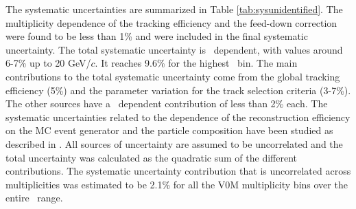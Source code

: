 The systematic uncertainties are summarized in Table \ref{tab:sysunidentified}. The multiplicity dependence of the tracking efficiency and the feed-down correction were found to be less than 1\% and were included in the final systematic uncertainty. The total systematic uncertainty is \pt~dependent, with values around 6-7\% up to 20 GeV/$c$. It reaches 9.6\% for the highest \pt~bin. The main contributions to the total systematic uncertainty come from the global tracking efficiency (5\%) and the parameter variation for the track selection criteria (3-7\%). The other sources have a \pt~dependent contribution of less than 2\% each. The systematic uncertainties related to the dependence of the reconstruction efficiency on the MC event generator and the particle composition have been studied as described in \cite{Abelev:2013ala}. All sources of uncertainty are assumed to be uncorrelated and the total uncertainty was calculated as the quadratic sum of the different contributions. The systematic uncertainty contribution that is uncorrelated across multiplicities was 
estimated to be 2.1\% for all the V0M multiplicity bins over the entire \pt~range.




